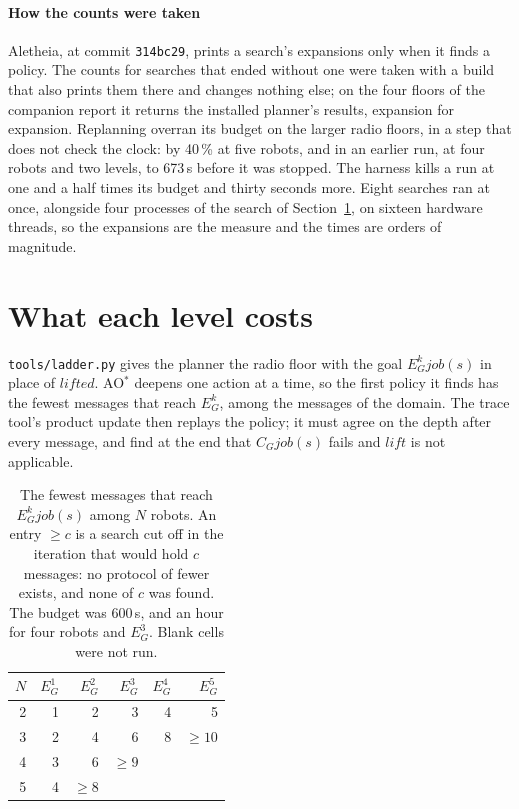 \documentclass[11pt,a4paper]{article}
\theoremstyle{definition}
\newcommand{\Eop}[1]{E_{#1}}
\newcommand{\Cop}[1]{C_{#1}}
\newcommand{\code}[1]{\texttt{\small #1}}
\newcommand{\job}{\mathit{job}}
\begin{document}
\paragraph{How the counts were taken} Aletheia, at commit \code{314bc29},
prints a search's expansions only when it finds a policy. The counts for
searches that ended without one were taken with a build that also prints them
there and changes nothing else; on the four floors of the companion report it
returns the installed planner's results, expansion for expansion. Replanning
overran its budget on the larger radio floors, in a step that does not check
the clock: by 40\,\% at five robots, and in an earlier run, at four robots and
two levels, to 673\,s before it was stopped. The harness kills a run at one and
a half times its budget and thirty seconds more. Eight searches ran at once,
alongside four processes of the search of Section~\ref{sec:ladder}, on sixteen
hardware threads, so the expansions are the measure and the times are orders of
magnitude.

\section{What each level costs}
\label{sec:ladder}

\code{tools/ladder.py} gives the planner the radio floor with the goal
$\Eop{G}^k\job(s)$ in place of $\mathit{lifted}$. AO$^*$ deepens one action at
a time, so the first policy it finds has the fewest messages that reach
$\Eop{G}^k$, among the messages of the domain. The trace tool's product update
then replays the policy; it must agree on the depth after every message, and
find at the end that $\Cop{G}\job(s)$ fails and $\mathit{lift}$ is not
applicable.

\begin{table}[H]
\centering\small
\caption{The fewest messages that reach $\Eop{G}^k\job(s)$ among $N$ robots.
An entry $\geq c$ is a search cut off in the iteration that would hold $c$
messages: no protocol of fewer exists, and none of $c$ was found. The budget was
600\,s, and an hour for four robots and $\Eop{G}^3$. Blank cells were not run.}
\label{tab:ladder}
\begin{tabular}{@{}r r r r r r@{}}
\toprule
$N$ & $\Eop{G}^1$ & $\Eop{G}^2$ & $\Eop{G}^3$ & $\Eop{G}^4$ & $\Eop{G}^5$ \\
\midrule
2 & 1 & 2 & 3 & 4 & 5 \\
3 & 2 & 4 & 6 & 8 & $\geq 10$ \\
4 & 3 & 6 & $\geq 9$ & & \\
5 & 4 & $\geq 8$ & & & \\
\bottomrule
\end{tabular}
\end{table}
\end{document}
